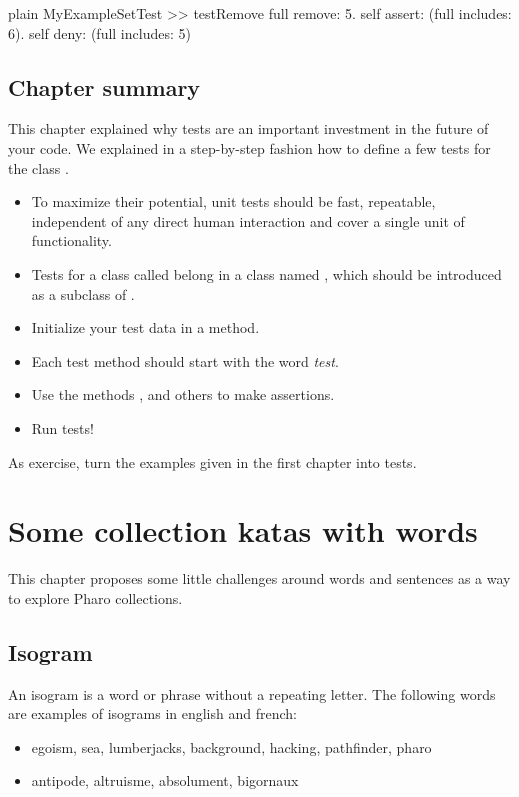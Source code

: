 \documentclass[10pt,twoside,english]{_support/latex/sbabook/sbabook}
\begin{document}
\begin{displaycode}{plain}
MyExampleSetTest >> testRemove
	full remove: 5.
	self assert: (full includes: 6).
	self deny: (full includes: 5)
\end{displaycode}
\section{Chapter summary}
This chapter explained why tests are an important investment in the future of
your code. We explained in a step-by-step fashion how to define a few tests for
the class . 

\begin{itemize}
\item To maximize their potential, unit tests should be fast, repeatable, independent of any direct human interaction and cover a single unit of functionality.
\item Tests for a class called  belong in a class named , which should be introduced as a subclass of .
\item Initialize your test data in a  method.
\item Each test method should start with the word \textit{test}.
\item Use the  methods ,  and others to make assertions.
\item Run tests!
\end{itemize}

As exercise, turn the examples given in the first chapter into tests.

\chapter{Some collection katas with words}\label{cha:katas}
This chapter proposes some little challenges around words and sentences as a way to explore Pharo collections.
\section{Isogram}
An isogram is a word or phrase without a repeating letter. The following words are examples of isograms in english and french:

\begin{itemize}
\item egoism, sea, lumberjacks, background, hacking, pathfinder, pharo
\item antipode, altruisme, absolument, bigornaux
\end{itemize}
\end{document}
